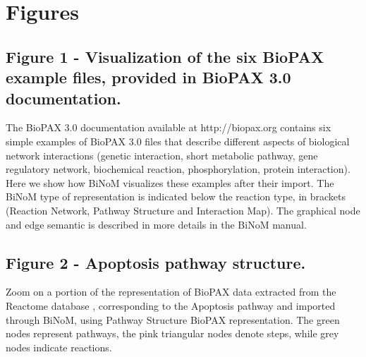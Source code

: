 \documentclass[10pt]{bmc_article}
\newenvironment{bmcformat}{\baselineskip20pt\sloppy\setboolean{publ}{false}}{\baselineskip20pt\sloppy}
\begin{document}
\begin{bmcformat}
\newpage
{
   }     %





\section*{Figures}

  \subsection*{Figure 1 - Visualization of the six BioPAX example files, provided in BioPAX 3.0 documentation.}
The BioPAX 3.0 documentation available at http://biopax.org contains six simple examples
of BioPAX 3.0 files that describe different aspects of biological network
interactions (genetic interaction, short metabolic pathway, gene regulatory
network, biochemical reaction, phosphorylation, protein interaction). Here we
show how BiNoM visualizes these examples after their import. The BiNoM type of
representation is indicated below the reaction type, in brackets (Reaction
Network, Pathway Structure and Interaction Map). The graphical node and edge
semantic is described in more details in the BiNoM manual.

  \subsection*{Figure 2 - Apoptosis pathway structure.}
Zoom on a portion of the representation of BioPAX data extracted from the Reactome database
\cite{joshi2005reactome}, corresponding to the Apoptosis pathway and imported through
BiNoM, using Pathway Structure BioPAX representation. The green nodes represent pathways, the pink
triangular nodes denote steps, while grey nodes indicate reactions.


\end{bmcformat}
\end{document}
